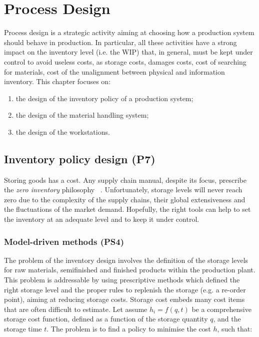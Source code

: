 \chapter{Process Design} \label{chapProdProcessDesign}

Process design is a strategic activity aiming at choosing how a production system should behave in production. In particular, all these activities have a strong impact on the inventory level (i.e. the WIP) that, in general, must be kept under control to avoid useless costs, as storage costs, damages costs, cost of searching for materials, cost of the unalignment between physical and information inventory. This chapter focuses on:

\begin{enumerate}
    \item the design of the inventory policy of a production system;
	\item the design of the material handling system;
	\item the design of the workstations.
\end{enumerate}

\section{Inventory policy design (P7)}

Storing goods has a cost. Any supply chain manual, despite its focus, prescribe the \textit{zero inventory} philosophy ~\cite{Womack1992,WomackJ.P.&Jones2000}. Unfortunately, storage levels will never reach zero due to the complexity of the supply chains, their global extensiveness and the fluctuations of the market demand. Hopefully, the right tools can help to set the inventory at an adequate level and to keep it under control. 

\subsection{Model-driven methods (PS4)}
The problem of the inventory design involves the definition of the storage levels for raw materials, semifinished and finished products within the production plant. This problem is addressable by using prescriptive methods which defined the right storage level and the proper rules to replenish the storage (e.g. a re-order point), aiming at reducing storage costs. Storage cost embeds many cost items that are often difficult to estimate. Let assume $h_i=f(q,t)$ be a comprehensive storage cost function, defined as a function of the storage quantity $q$, and the storage time $t$. The problem is to find a policy to minimise the cost $h$, such that:

